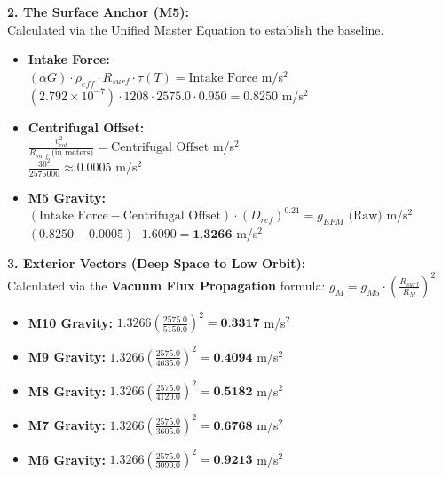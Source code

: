 \documentclass[11pt, a4paper]{article}
\begin{document}
  \vspace{1.0em}
  \noindent \textbf{2. The Surface Anchor (M5):} \\
  \hspace*{1em} Calculated via the Unified Master Equation to establish the baseline.
  \begin{itemize}
    \item \textbf{Intake Force:} \\[0.5em]
    \hspace*{2em} $(\alpha G) \cdot \rho_{eff} \cdot R_{surf} \cdot \tau(T) = \text{Intake Force}$ m/s$^2$ \\[1em]
    \hspace*{2em} $(2.792 \times 10^{-7}) \cdot 1208 \cdot 2575.0 \cdot 0.950 = 0.8250$ m/s$^2$
    
    \item \textbf{Centrifugal Offset:} \\[0.5em]
    \hspace*{2em} $\frac{v_{rot}^2}{R_{surf} \text{ (in meters)}} = \text{Centrifugal Offset}$ m/s$^2$ \\[1em]
    \hspace*{2em} $\frac{36^2}{2575000} \approx 0.0005$ m/s$^2$
    
    \item \textbf{M5 Gravity:} \\[0.5em]
    \hspace*{2em} $(\text{Intake Force} - \text{Centrifugal Offset}) \cdot (D_{ref})^{0.21} = g_{EFM} \text{ (Raw)}$ m/s$^2$ \\[1em]
    \hspace*{2em} $(0.8250 - 0.0005) \cdot 1.6090 = \textbf{1.3266}$ m/s$^2$
  \end{itemize}

  \clearpage
  \noindent \textbf{3. Exterior Vectors (Deep Space to Low Orbit):} \\
  \hspace*{1em} Calculated via the \textbf{Vacuum Flux Propagation} formula: $g_M = g_{M5} \cdot \left( \frac{R_{surf}}{R_M} \right)^2$
  \begin{itemize}
    \item \textbf{M10 Gravity:} $1.3266 \left( \frac{2575.0}{5150.0} \right)^2 = \textbf{0.3317}$ m/s$^2$
    \item \textbf{M9 Gravity:} $1.3266 \left( \frac{2575.0}{4635.0} \right)^2 = \textbf{0.4094}$ m/s$^2$
    \item \textbf{M8 Gravity:} $1.3266 \left( \frac{2575.0}{4120.0} \right)^2 = \textbf{0.5182}$ m/s$^2$
    \item \textbf{M7 Gravity:} $1.3266 \left( \frac{2575.0}{3605.0} \right)^2 = \textbf{0.6768}$ m/s$^2$
    \item \textbf{M6 Gravity:} $1.3266 \left( \frac{2575.0}{3090.0} \right)^2 = \textbf{0.9213}$ m/s$^2$
  \end{itemize}
\end{document}
